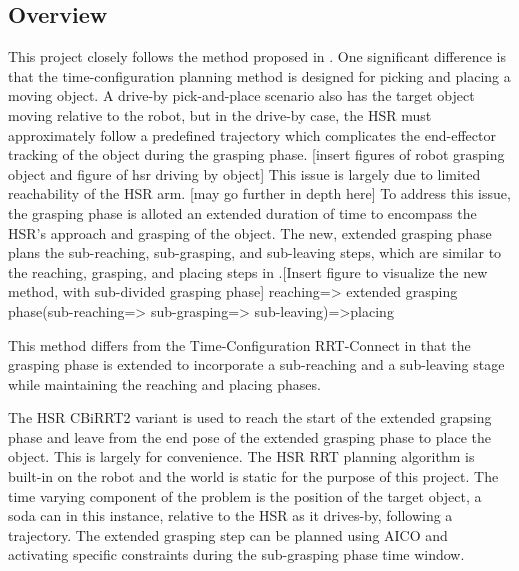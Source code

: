 \documentclass[12pt]{article}
\begin{document}
        \subsection{Overview}
            This project closely follows the method proposed in \cite{yang_planning_2018}. One significant difference is that the  time-configuration planning method is designed for picking and placing a moving object. A drive-by pick-and-place scenario also has the target object moving relative to the robot, but in the drive-by case, the HSR must approximately follow a predefined trajectory which complicates the end-effector tracking of the object during the grasping phase. [insert figures of robot grasping object and figure of hsr driving by object] This issue is largely due to limited reachability of the HSR arm. [may go further in depth here] To address this issue, the grasping phase is alloted an extended duration of time to encompass the HSR's approach and grasping of the object. The new, extended grasping phase plans the sub-reaching, sub-grasping, and sub-leaving steps, which are similar to the reaching, grasping, and placing steps in \cite{yang_planning_2018}.[Insert figure to visualize the new method, with sub-divided grasping phase] reaching=> extended grasping phase(sub-reaching=> sub-grasping=> sub-leaving)=>placing

            \par This method differs from the Time-Configuration RRT-Connect in that the grasping phase is extended to incorporate a sub-reaching and a sub-leaving stage while maintaining the reaching and placing phases. 

            \par The HSR CBiRRT2 variant is used to reach the start of the extended grapsing phase and leave from the end pose of the extended grasping phase to place the object. This is largely for convenience. The HSR RRT planning algorithm is built-in on the robot and the world is static for the purpose of this project. The time varying component of the problem is the position of the target object, a soda can in this instance, relative to the HSR as it drives-by, following a trajectory. 
            The extended grasping step can be planned using AICO and activating specific constraints during the sub-grasping phase time window.
        
\end{document}
